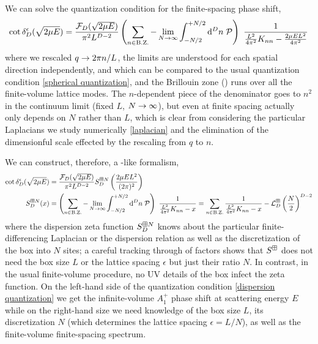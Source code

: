 We can solve the quantization condition for the finite-spacing phase shift,
\begin{align}
    \cot \delta_D^\epsilon(\sqrt{2 \mu E})
    =
    \frac{\mathcal{F}_D(\sqrt{2 \mu E})}{\pi^2 L^{D-2}}
    \left(\sum_{n\in\text{B.Z.}} - \lim_{N\rightarrow\infty}\int_{-N/2}^{+N/2} \mathrm{d}^D n\; \mathcal{P} \right)\  \frac{1}{\frac{L^2}{4\pi^2} K_{nn}-\frac{2\mu E L^2}{4\pi^2}}
\end{align}
where we rescaled $q\rightarrow 2\pi n/L$, the limits are understood for each spatial direction independently, and which can be compared to the usual quantization condition \eqref{spherical quantization}, and the Brillouin zone (\BZ) runs over all the finite-volume lattice modes.
The $n$-dependent piece of the denominator goes to $n^2$ in the continuum limit (fixed $L$, $N\rightarrow\infty$), but even at finite spacing actually only depends on $N$ rather than $L$, which is clear from considering the particular Laplacians we study numerically \eqref{laplacian} and the elimination of the dimensionful scale effected by the rescaling from $q$ to $n$.

We can construct, therefore, a \Luscher-like formalism,
\begin{align}
    \label{eq:dispersion quantization}
    \cot \delta_D^{\epsilon}( \sqrt{2 \mu E} ) &= \frac{\mathcal{F}_D(\sqrt{2 \mu E})}{\pi^2 L^{D-2}} S^{\boxplus N}_{D}\left(\frac{2\mu E L^2}{(2\pi)^2}\right)
    \\
    \label{eq:dispersion S}
    S^{\boxplus N}_{D}( x )
    &=
    \left(\sum_{n\in\text{B.Z.}} - \lim_{N\rightarrow\infty}\int_{-N/2}^{+N/2} \mathrm{d}^D n\; \mathcal{P} \right)\  \frac{1}{ \frac{L^2}{4\pi^2}K_{nn} - x} = \sum_{n\in\text{B.Z.}}\frac{1}{ \frac{L^2}{4\pi^2}K_{nn} - x} - \mathcal{L}_D^{\boxplus}\left(\frac{N}{2}\right)^{D-2}
\end{align}
where the dispersion zeta function $S^{\boxplus N}_{D}$ knows about the particular finite-differencing Laplacian or the dispersion relation as well as the discretization of the box into $N$ sites; a careful tracking through of factors shows that $S^{\boxplus}$ does not need the box size $L$ or the lattice spacing $\epsilon$ but just their ratio $N$.
In contrast, in the usual finite-volume procedure, no UV details of the box infect the zeta function.
On the left-hand side of the quantization condition \eqref{dispersion quantization} we get the infinite-volume $A_1^+$ phase shift at scattering energy $E$ while on the right-hand size we need knowledge of the box size $L$, its discretization $N$ (which determines the lattice spacing $\epsilon=L/N$), as well as the finite-volume finite-spacing spectrum.

